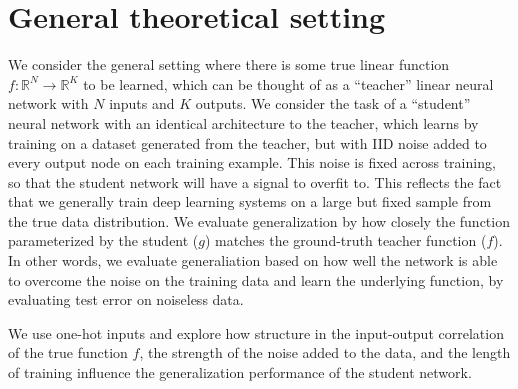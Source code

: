 \documentclass{article}
\newcommand{\R}{\mathbb{R}}
\begin{document}
\section{General theoretical setting}
We consider the general setting where there is some true linear function \(f: \R^N \rightarrow \R^K\) to be learned, which can be thought of as a ``teacher'' linear neural network with \(N\) inputs and \(K\) outputs. We consider the task of a ``student'' neural network with an identical architecture to the teacher, which learns by training on a dataset generated from the teacher, but with IID noise added to every output node on each training example. This noise is fixed across training, so that the student network will have a signal to overfit to. This reflects the fact that we generally train deep learning systems on a large but fixed sample from the true data distribution. We evaluate generalization by how closely the function parameterized by the student (\(g\)) matches the ground-truth teacher function (\(f\)). In other words, we evaluate generaliation based on how well the network is able to overcome the noise on the training data and learn the underlying function, by evaluating test error on noiseless data. \par
We use one-hot inputs and explore how structure in the input-output correlation of the true function \(f\), the strength of the noise added to the data, and the length of training influence the generalization performance of the student network. 
\end{document}
